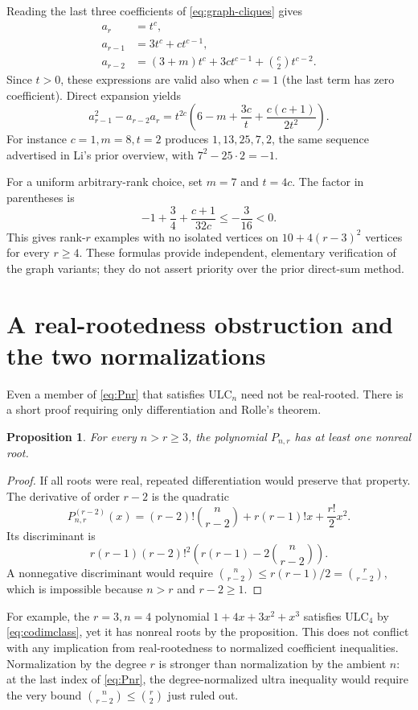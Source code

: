 \documentclass[11pt,letterpaper]{article}
\numberwithin{equation}{section}
\newtheorem{proposition}[theorem]{Proposition}
\theoremstyle{definition}
\theoremstyle{remark}
\newcommand{\ULC}{\mathrm{ULC}}
\begin{document}
Reading the last three coefficients of \eqref{eq:graph-cliques} gives
\begin{align*}
 a_r&=t^c,\\
 a_{r-1}&=3t^c+ct^{c-1},\\
 a_{r-2}&=(3+m)t^c+3ct^{c-1}+\binom c2t^{c-2}.
\end{align*}
Since $t>0$, these expressions are valid also when $c=1$ (the last term
has zero coefficient). Direct expansion yields
\begin{equation}\label{eq:graph-defect}
 a_{r-1}^2-a_{r-2}a_r
 =t^{2c}\left(6-m+\frac{3c}{t}+\frac{c(c+1)}{2t^2}\right).
\end{equation}
For instance $c=1,m=8,t=2$ produces
$1,13,25,7,2$, the same sequence advertised in Li's prior overview,
with $7^2-25\cdot2=-1$.

For a uniform arbitrary-rank choice, set $m=7$ and $t=4c$. The factor in
parentheses is
\[
 -1+\frac34+\frac{c+1}{32c}\le-\frac3{16}<0.
\]
This gives rank-$r$ examples with no isolated vertices on
$10+4(r-3)^2$ vertices for every $r\ge4$.
These formulas provide independent, elementary verification of the graph
variants; they do not assert priority over the prior direct-sum method.

\section{A real-rootedness obstruction and the two normalizations}
\label{sec:roots}
Even a member of \eqref{eq:Pnr} that satisfies $\ULC_n$ need not be
real-rooted. There is a short proof requiring only differentiation and
Rolle's theorem.

\begin{proposition}\label{prop:roots}
For every $n>r\ge3$, the polynomial $P_{n,r}$ has at least one nonreal
root.
\end{proposition}
\begin{proof}
If all roots were real, repeated differentiation would preserve that
property. The derivative of order $r-2$ is the quadratic
\[
 P_{n,r}^{(r-2)}(x)
 =(r-2)!\binom n{r-2}+r(r-1)!x+\frac{r!}{2}x^2.
\]
Its discriminant is
\[
 r(r-1)(r-2)!^2
 \left(r(r-1)-2\binom n{r-2}\right).
\]
A nonnegative discriminant would require
$\binom n{r-2}\le r(r-1)/2=\binom r{r-2}$, which is impossible because
$n>r$ and $r-2\ge1$.
\end{proof}

For example, the $r=3,n=4$ polynomial $1+4x+3x^2+x^3$ satisfies
$\ULC_4$ by \eqref{eq:codimclass}, yet it has nonreal roots by the
proposition. This does not conflict with any implication from
real-rootedness to normalized coefficient inequalities. Normalization by
the degree $r$ is stronger than normalization by the ambient $n$:
at the last index of \eqref{eq:Pnr}, the degree-normalized ultra inequality
would require the very bound $\binom n{r-2}\le\binom r2$ just ruled out.
\end{document}
